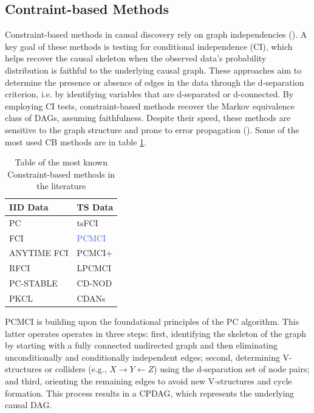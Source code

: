 \subsection{Contraint-based Methods}\label{Constraint-bsed Methods}
Constraint-based methods in causal discovery rely on graph independencies (\cite{molak2023causal}). A key goal of these methods is testing for conditional independence (CI), which helps recover the causal skeleton when the observed data’s probability distribution is faithful to the underlying causal graph.\cite{runge2020discovering} These approaches aim to determine the presence or absence of edges in the data through the d-separation criterion, i.e. by identifying variables that are d-separated or d-connected. By employing CI tests, constraint-based methods recover the Markov equivalence class of DAGs, assuming faithfulness. Despite their speed, these methods are sensitive to the graph structure and prone to error propagation (\cite{hasan2023survey}).
Some of the most used CB methods are in table \ref{CBm}.

\begin{table}[!ht]
    \centering
    \caption{Table of the most known Constraint-based methods in the literature}
    \begin{tabular}{|l|l|}
    \hline
        \textbf{IID Data} & \textbf{TS Data} \\ \hline
        PC & tsFCI \\ \hline
        FCI & \textcolor{RoyalBlue}{PCMCI} \\ \hline
        ANYTIME FCI & PCMCI+ \\ \hline
        RFCI & LPCMCI \\ \hline
        PC-STABLE & CD-NOD \\ \hline
        PKCL & CDANs \\ \hline
    \end{tabular}
    \label{CBm}
\end{table}


PCMCI is building upon the foundational principles of the PC algorithm. This latter operates operates in three steps: first, identifying the skeleton of the graph by starting with a fully connected undirected graph and then eliminating unconditionally and conditionally independent edges; second, determining V-structures or colliders (e.g., $X \rightarrow Y \leftarrow Z$) using the d-separation set of node pairs; and third, orienting the remaining edges to avoid new V-structures and cycle formation. This process results in a CPDAG, which represents the underlying causal DAG.\\

